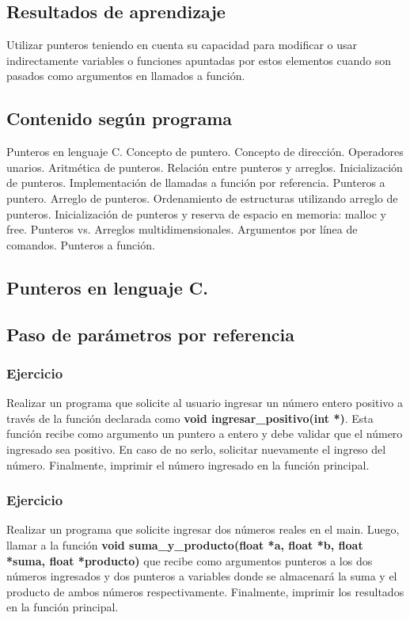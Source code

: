 \subsection*{Resultados de aprendizaje}
Utilizar punteros teniendo en cuenta su capacidad para modificar o usar indirectamente variables o funciones apuntadas por estos elementos cuando son pasados como argumentos en llamados a función.

\subsection*{Contenido según programa}
Punteros en lenguaje C.  Concepto de puntero.  Concepto de dirección.  Operadores unarios.  Aritmética de punteros.  Relación entre punteros y arreglos. Inicialización de punteros. Implementación de llamadas a función por referencia. Punteros a puntero. Arreglo de punteros. Ordenamiento de estructuras utilizando arreglo de punteros.  Inicialización de punteros y reserva de espacio en memoria: malloc y free.  Punteros vs. Arreglos multidimensionales.  Argumentos por línea de comandos. Punteros a función.

\setcounter{subsection}{8}
\subsection*{Punteros en lenguaje C.}

\subsection*{Paso de parámetros por referencia}

\subsubsection{Ejercicio}
Realizar un programa que solicite al usuario ingresar un número entero positivo a través de la función declarada como \textbf{void ingresar\_positivo(int *)}. Esta función recibe como argumento un puntero a entero y debe validar que el número ingresado sea positivo. En caso de no serlo, solicitar nuevamente el ingreso del número. Finalmente, imprimir el número ingresado en la función principal. 

\subsubsection{Ejercicio}
Realizar un programa que solicite ingresar dos números reales en el main. Luego, llamar a la función \textbf{void suma\_y\_producto(float *a, float *b, float *suma, float *producto)} que recibe como argumentos punteros a los dos números ingresados y dos punteros a variables donde se almacenará la suma y el producto de ambos números respectivamente. Finalmente, imprimir los resultados en la función principal.


